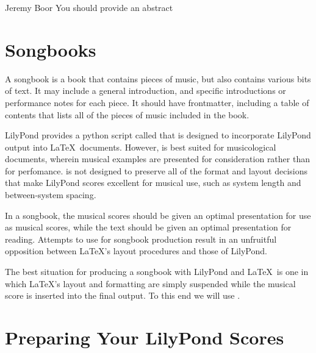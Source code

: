 \documentclass[../../LilyPond-Tutorials]{subfiles}
\begin{document}

\begin{authorAbstract}{Jeremy Boor}
You should provide an abstract
\end{authorAbstract}

\section*{Songbooks}
A songbook is a book that contains pieces of music, but also contains various bits of text. 
It may include a general introduction, and specific introductions or performance notes for each piece. 
It should have frontmatter, including a table of contents that lists all of the pieces of music included in the book. 

LilyPond provides a python script called   that is designed to incorporate LilyPond output into \LaTeX\ documents. 
However,  is best suited for musicological documents, wherein musical examples are presented for consideration rather than for perfomance. 
 is not designed to preserve all of the format and layout decisions that make LilyPond scores excellent for musical use, such as system length and between-system spacing. 

In a songbook, the musical scores should be given an optimal presentation for use as musical scores, while the text should be given an optimal presentation for reading. 
Attempts to use  for songbook production result in an unfruitful opposition between \LaTeX's layout procedures and those of LilyPond.

The best situation for producing a songbook with LilyPond and \LaTeX\ is one in which \LaTeX's layout and formatting are simply suspended while the musical score is inserted into the final output. 
To this end we will use  .

\section*{Preparing Your LilyPond Scores}
\end{document}
